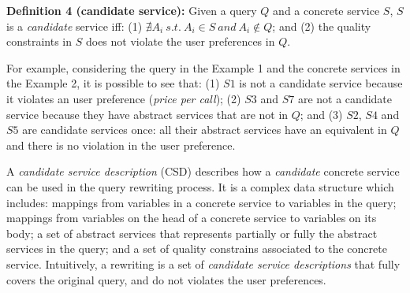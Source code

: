 \noindent \textbf{Definition 4 (candidate service):} Given a query $Q$ and a concrete service $S$, $S$ is a \textit{candidate} service iff: (1) $\nexists A_{i} \ s.t. \ A_{i} \in S \ and \ A_{i} \not\in Q$; and (2) the quality constraints in $S$ does not violate the user preferences in $Q$. 

For example, considering the query in the Example 1 and the concrete services in the Example 2, it is possible to see that:
(1) $S1$ is not a candidate service because it violates an user preference (\textit{price per call});
(2) $S3$ and $S7$ are not a candidate service because they have abstract services that are not in $Q$; and
(3) $S2$, $S4$ and $S5$ are candidate services once: all their abstract services have an equivalent in $Q$ and there is no violation in the user preference.



A \textit{candidate service description} (CSD) describes how a \textit{candidate} concrete service can be used in the query rewriting process.
It is a complex data structure which includes: mappings from variables in a concrete service to variables in the query; 
mappings from variables on the head of a concrete service to variables on its body;
a set of abstract services that represents partially or fully the abstract services in the query; and 
a set of quality constrains associated to the concrete service.
Intuitively, a rewriting is a set of \textit{candidate service descriptions} that fully covers the original query, and do not violates the user preferences.

